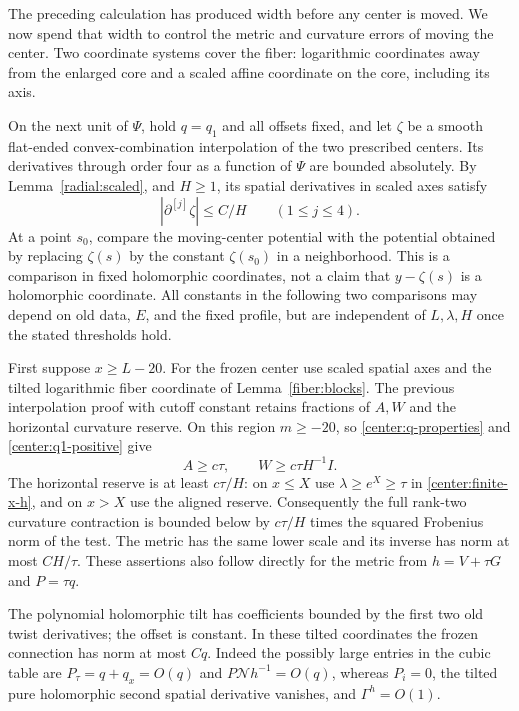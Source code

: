 The preceding calculation has produced width before any center is moved.
We now spend that width to control the metric and curvature errors of
moving the center. Two coordinate systems cover the fiber: logarithmic
coordinates away from the enlarged core and a scaled affine coordinate
on the core, including its axis.

On the next unit of $\Psi$, hold $q=q_1$ and all offsets fixed, and let $\zeta$ be a smooth flat-ended convex-combination interpolation of the two prescribed centers. Its derivatives through order four as a function of $\Psi$ are bounded absolutely. By Lemma~\ref{radial:scaled}, and $H\ge1$, its spatial derivatives in scaled axes satisfy
\begin{equation}\label{center:zeta-jets}
 |\partial^{[j]}\zeta|\le C/H\qquad(1\le j\le4).
\end{equation}
At a point $s_0$, compare the moving-center potential with the potential obtained by replacing $\zeta(s)$ by the constant $\zeta(s_0)$ in a neighborhood. This is a comparison in fixed holomorphic coordinates, not a claim that $y-\zeta(s)$ is a holomorphic coordinate. All constants in the following two comparisons may depend on old data, $E$, and the fixed profile, but are independent of $L,\lambda,H$ once the stated thresholds hold.

First suppose $x\ge L-20$. For the frozen center use scaled spatial axes and the tilted logarithmic fiber coordinate of Lemma~\ref{fiber:blocks}. The previous interpolation proof with cutoff constant retains fractions of $A,W$ and the horizontal curvature reserve. On this region $m\ge-20$, so \eqref{center:q-properties} and \eqref{center:q1-positive} give
\[
 A\ge c\tau,\qquad W\ge c\tau H^{-1}I.
\]
The horizontal reserve is at least $c\tau/H$: on $x\le X$ use $\lambda\ge e^X\ge\tau$ in \eqref{center:finite-x-h}, and on $x>X$ use the aligned reserve. Consequently the full rank-two curvature contraction is bounded below by $c\tau/H$ times the squared Frobenius norm of the test. The metric has the same lower scale and its inverse has norm at most $CH/\tau$. These assertions also follow directly for the metric from $h=V+\tau G$ and $P=\tau q$.

The polynomial holomorphic tilt has coefficients bounded by the first two old twist derivatives; the offset is constant. In these tilted coordinates the frozen connection has norm at most $Cq$. Indeed the possibly large entries in the cubic table are $P_\tau=q+q_x=O(q)$ and $P\mathcal Nh^{-1}=O(q)$, whereas $P_i=0$, the tilted pure holomorphic second spatial derivative vanishes, and $\Gamma^h=O(1)$.

